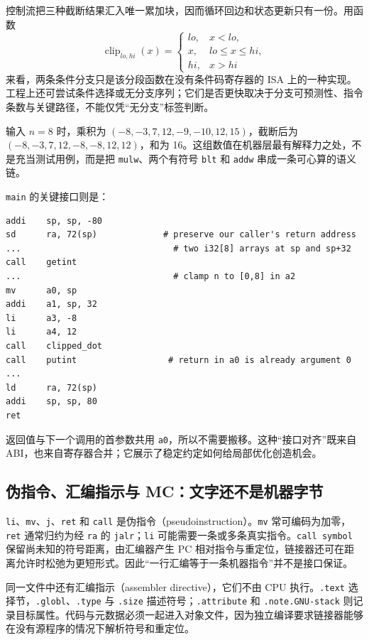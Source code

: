 控制流把三种截断结果汇入唯一累加块，因而循环回边和状态更新只有一份。用函数
\[
  \operatorname{clip}_{lo,hi}(x)=
  \begin{cases}
    lo,&x<lo,\\ x,&lo\le x\le hi,\\ hi,&x>hi
  \end{cases}
\]
来看，两条条件分支只是该分段函数在没有条件码寄存器的 ISA 上的一种实现。工程上还可尝试条件选择或无分支序列；它们是否更快取决于分支可预测性、指令条数与关键路径，不能仅凭“无分支”标签判断。

输入 $n=8$ 时，乘积为 $(-8,-3,7,12,-9,-10,12,15)$，截断后为 $(-8,-3,7,12,-8,-8,12,12)$，和为 16。这组数值在机器层最有解释力之处，不是充当测试用例，而是把 \texttt{mulw}、两个有符号 \texttt{blt} 和 \texttt{addw} 串成一条可心算的语义链。

\texttt{main} 的关键接口则是：
\begin{lstlisting}[language=RISCV,basicstyle=\ttfamily\scriptsize]
addi    sp, sp, -80
sd      ra, 72(sp)             # preserve our caller's return address
...                              # two i32[8] arrays at sp and sp+32
call    getint
...                              # clamp n to [0,8] in a2
mv      a0, sp
addi    a1, sp, 32
li      a3, -8
li      a4, 12
call    clipped_dot
call    putint                  # return in a0 is already argument 0
...
ld      ra, 72(sp)
addi    sp, sp, 80
ret
\end{lstlisting}
返回值与下一个调用的首参数共用 \texttt{a0}，所以不需要搬移。这种“接口对齐”既来自 ABI，也来自寄存器合并；它展示了稳定约定如何给局部优化创造机会。

\subsection{伪指令、汇编指示与 MC：文字还不是机器字节}

\texttt{li}、\texttt{mv}、\texttt{j}、\texttt{ret} 和 \texttt{call} 是伪指令（pseudoinstruction）。\texttt{mv} 常可编码为加零，\texttt{ret} 通常归约为经 \texttt{ra} 的 \texttt{jalr}；\texttt{li} 可能需要一条或多条真实指令。\texttt{call symbol} 保留尚未知的符号距离，由汇编器产生 PC 相对指令与重定位，链接器还可在距离允许时松弛为更短形式\cite{bin-riscv-asm,bin-riscv-psabi-relax}。因此“一行汇编等于一条机器指令”并不是接口保证。

同一文件中还有汇编指示（assembler directive），它们不由 CPU 执行。\texttt{.text} 选择节，\texttt{.globl}、\texttt{.type} 与 \texttt{.size} 描述符号；\texttt{.attribute} 和 \texttt{.note.GNU-stack} 则记录目标属性。代码与元数据必须一起进入对象文件，因为独立编译要求链接器能够在没有源程序的情况下解析符号和重定位。

